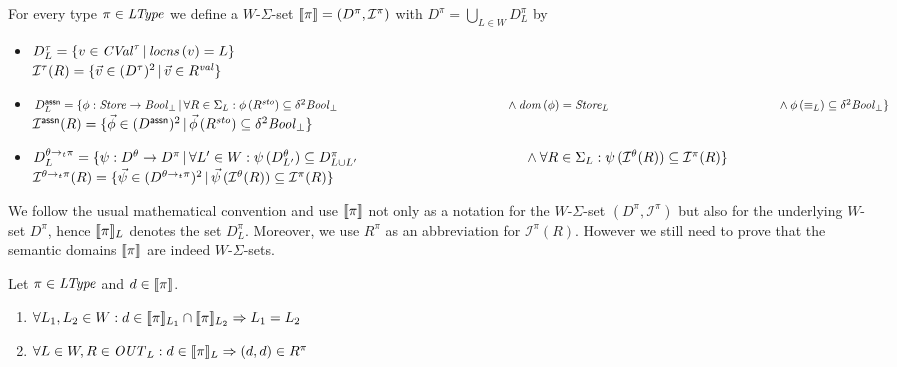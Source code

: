 \documentclass[12pt,a4paper]{report}
\newcommand{\CVal}{\nstyle{CVal}}
\newcommand{\sto}{\nstyle{sto}}
\newcommand{\val}{\nstyle{val}}
\newcommand{\OUT}{\nstyle{OUT}}
\newcommand{\I}{\mathcal{I}}
\begin{document}
\begin{definition}
  For every type $\pi\in\mathit{LType}$ we define a $W$-$\Sigma$-set $\semantic{\pi}=(D^\pi,\I^\pi)$
  with $D^\pi = \bigcup_{L\in W} D^\pi_L$ by
  \begin{itemize}
    \item $D^\tau_L = \{v\in\CVal^\tau\,|\,\locns{v} = L\}$ \\
          $\I^\tau(R) = \{\vec{v}\in(D^\tau)^2\,|\,\vec{v}\in R^\val\}$

    \item $D^\tassn_L = \{ \phi:\Store\to\Bool_\bot\,|\,
                              \forall R\in\Sigma_L:\phi\,(R^\sto) \subseteq \delta^2\Bool_\bot \\
                              \hspace*{5cm} \wedge \dom{\phi} = \Store_L \\
                              \hspace*{5cm} \wedge \phi\,(\equiv_L) \subseteq \delta^2\Bool_\bot
                         \}$ \\
          $\I^\tassn(R) = \{ \vec{\phi} \in (D^\tassn)^2\,|\,
                                  \vec{\phi}\,(R^\sto) \subseteq \delta^2 \Bool_\bot \}$

    \item $D^{\ttarrow{\theta}{\pi}}_L = \{ \psi:D^\theta \to D^\pi\,|\,
                              \forall L'\in W: \psi\,(D^\theta_{L'}) \subseteq D^\pi_{L \cup L'} \\
                              \hspace*{4.2cm} \wedge \forall R\in\Sigma_L: \psi\,(\I^\theta(R))\subseteq\I^\pi(R)\}$ \\
          $\I^{\ttarrow{\theta}{\pi}}(R) = \{ \vec{\psi} \in (D^{\ttarrow{\theta}{\pi}})^2\,|\,
                                          \vec{\psi}\,(\I^\theta(R)) \subseteq \I^\pi(R) \}$
  \end{itemize}
\end{definition}

We follow the usual mathematical convention and use $\llbracket\pi\rrbracket$ not only as a notation
for the $W$-$\Sigma$-set $(D^\pi,\I^\pi)$ but also for the underlying $W$-set $D^\pi$,
hence $\llbracket\pi\rrbracket_L$ denotes the set $D^\pi_L$. Moreover, we use $R^\pi$ as an abbreviation
for $\I^\pi(R)$. However we still need to prove that the semantic domains $\llbracket\pi\rrbracket$
are indeed $W$-$\Sigma$-sets.

\begin{lemma}
  Let $\pi\in\mathit{LType}$ and $d \in \llbracket\pi\rrbracket$.
  \begin{enumerate}
    \item $\forall L_1,L_2\in W: d \in \llbracket\pi\rrbracket_{L_1} \cap \llbracket\pi\rrbracket_{L_2} \Rightarrow L_1 = L_2$
    \item $\forall L \in W, R\in \OUT_L: d \in \semantic{\pi}_L \Rightarrow (d,d) \in R^\pi$
  \end{enumerate}
\end{lemma}
\end{document}
